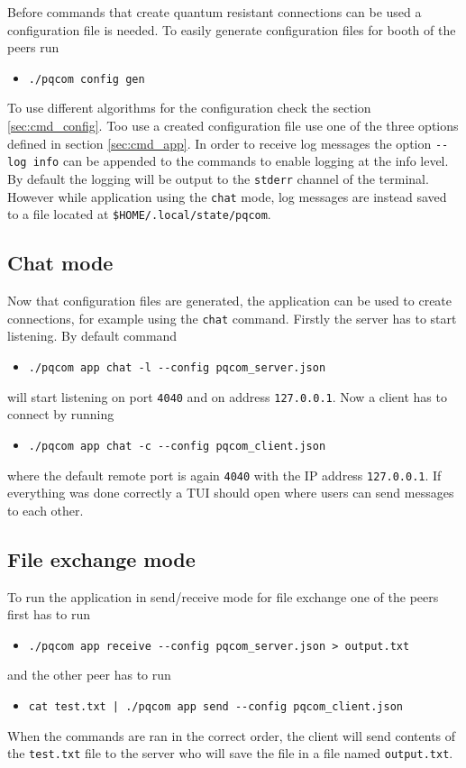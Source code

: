 Before commands that create quantum resistant connections can be used a configuration file is needed. To easily generate configuration files for booth of the peers run
\begin{itemize}
  \item \texttt{./pqcom config gen}
\end{itemize}
To use different algorithms for the configuration check the section \ref{sec:cmd_config}. Too use a created configuration file use one of the three options defined in section \ref{sec:cmd_app}. In order to receive log messages the option \texttt{-\--log info} can be appended to the commands to enable logging at the info level. By default the logging will be output to the \texttt{stderr} channel of the terminal. However while application using the \texttt{chat} mode, log messages are instead saved to a file located at \texttt{\$HOME/.local/state/pqcom}.

\subsection{Chat mode}
Now that configuration files are generated, the application can be used to create connections, for example using the \texttt{chat} command. Firstly the server has to start listening. By default command
\begin{itemize}
  \item \texttt{./pqcom app chat -l -\--config pqcom\_server.json}
\end{itemize}
will start listening on port \texttt{4040} and on address \texttt{127.0.0.1}. Now a client has to connect by running
\begin{itemize}
  \item \texttt{./pqcom app chat -c -\--config pqcom\_client.json}
\end{itemize}
where the default remote port is again \texttt{4040} with the IP address \texttt{127.0.0.1}. If everything was done correctly a TUI should open where users can send messages to each other.

\subsection{File exchange mode}
To run the application in send/receive mode for file exchange one of the peers first has to run
\begin{itemize}
  \item \texttt{./pqcom app receive -\--config pqcom\_server.json > output.txt}
\end{itemize}
and the other peer has to run
\begin{itemize}
  \item \texttt{cat test.txt | ./pqcom app send -\--config pqcom\_client.json}
\end{itemize}
When the commands are ran in the correct order, the client will send contents of the \texttt{test.txt} file to the server who will save the file in a file named \texttt{output.txt}.

